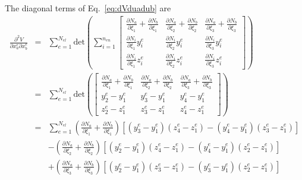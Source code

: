 \documentclass[12pt,aps,pre]{revtex4}
\begin{document}
The diagonal terms of Eq.\ \eqref{eq:dVduadub} are
%
\begin{eqnarray}
\frac{\partial^2 V}{\partial x_a^e \partial x_b^e} &=& \sum_{e=1}^{N_{el}} \text{det}\left(\sum_{i=1}^{n_{en}}
%
\begin{bmatrix}
\frac{\partial N_a}{\partial \xi_1}+\frac{\partial N_b}{\partial \xi_1}  & \frac{\partial N_a}{\partial \xi_2}+\frac{\partial N_b}{\partial \xi_2} & \frac{\partial N_a}{\partial \xi_3}+\frac{\partial N_b}{\partial \xi_3} \\
%
\frac{\partial N_i}{\partial \xi_1}y_i^e   & \frac{\partial N_i}{\partial \xi_2}y_i^e & \frac{\partial N_i}{\partial \xi_3}y_i^e \\
%
\frac{\partial N_i}{\partial \xi_1}z_i^e  & \frac{\partial N_i}{\partial \xi_2}z_i^e & \frac{\partial N_i}{\partial \xi_3}z_i^e 
\end{bmatrix}\right) \nonumber\\
&=& \sum_{e=1}^{N_{el}} \text{det}\left(
%
\begin{bmatrix}
\frac{\partial N_a}{\partial \xi_1}+\frac{\partial N_b}{\partial \xi_1}  & \frac{\partial N_a}{\partial \xi_2}+\frac{\partial N_b}{\partial \xi_2} & \frac{\partial N_a}{\partial \xi_3}+\frac{\partial N_b}{\partial \xi_3} \\
%
y_2^e - y_1^e & y_3^e - y_1^e & y_4^e - y_1^e \\
%
z_2^e - z_1^e & z_3^e - z_1^e & z_4^e - z_1^e 
\end{bmatrix}\right) \nonumber\\
&=& \sum_{e=1}^{N_{el}}\left(\frac{\partial N_a}{\partial \xi_1}+\frac{\partial N_b}{\partial \xi_1}\right)[(y_3^e - y_1^e)(z_4^e - z_1^e)-(y_4^e - y_1^e)(z_3^e - z_1^e)] \nonumber\\
%
&&-\left(\frac{\partial N_a}{\partial \xi_2}+\frac{\partial N_b}{\partial \xi_2}\right)\left[(y_2^e - y_1^e)(z_4^e - z_1^e)-(y_4^e - y_1^e)(z_2^e - z_1^e)\right] \nonumber\\
%
&&+\left(\frac{\partial N_a}{\partial \xi_3}+\frac{\partial N_b}{\partial \xi_3}\right)\left[(y_2^e - y_1^e)(z_3^e - z_1^e)-(y_3^e - y_1^e)(z_2^e - z_1^e)\right]
\end{eqnarray}
\end{document}
